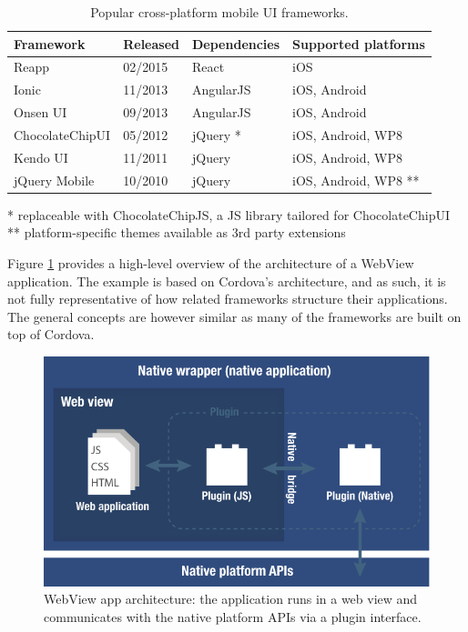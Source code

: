 \documentclass[thesis.tex]{subfiles}
\begin{document}
\begin{table}[hb]
	\caption{Popular cross-platform mobile UI frameworks.} \label{table:cross-platform-mobile-ui-frameworks}

	\begin{center}
	\begin{tabular}{| m{3.05cm} | m{1.75cm} | m{2.75cm} | m{4.25cm} |}

		\hline
		\textbf{Framework}	&	\textbf{Released}		&		\textbf{Dependencies}		&	\textbf{Supported platforms}		\\ \hline

		Reapp				&	02/2015						&	React						&	iOS 								\\ \hline
		Ionic				&	11/2013						&	AngularJS					&	iOS, Android						\\ \hline
		Onsen UI			&	09/2013						&	AngularJS					&	iOS, Android						\\ \hline
		ChocolateChipUI 	&	05/2012						&	jQuery \footnotesize{*}		&	iOS, Android, WP8					\\ \hline
		Kendo UI			&	11/2011						&	jQuery						&	iOS, Android, WP8					\\ \hline
		jQuery Mobile 		&	10/2010						&	jQuery						&	iOS, Android, WP8 \footnotesize{**}	\\ \hline

	\end{tabular}
	\end{center}
	\scriptsize{*} \small{replaceable with ChocolateChipJS, a JS library tailored for ChocolateChipUI}\\
	\scriptsize{**} \small{platform-specific themes available as 3rd party extensions}
\end{table}

Figure \ref{fig:web-view-app} provides a high-level overview of the architecture of a Web\-View application. The example is based on Cordova's architecture, and as such, it is not fully representative of how related frameworks structure their applications. The general concepts are however similar as many of the frameworks are built on top of Cordova.

\begin{figure}[ht]
\centering \includegraphics[width=\textwidth]{images/web-view-app-structure}
\caption{WebView app architecture: the application runs in a web view and communicates with the native platform APIs via a plugin interface.\label{fig:web-view-app}}
\end{figure}
\end{document}
